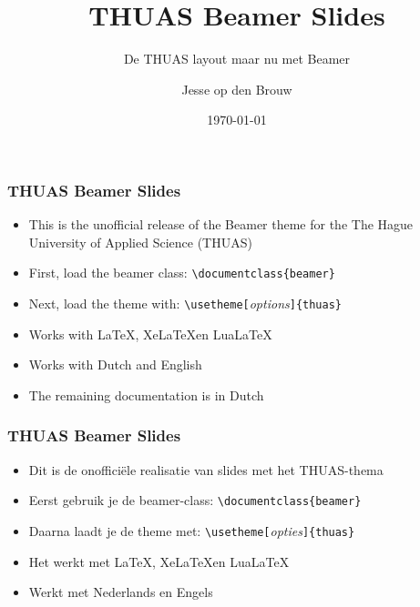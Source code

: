 \documentclass[fleqn,aspectratio=169,dutch,10pt]{beamer}
\title{THUAS Beamer Slides}
\subtitle{De THUAS layout maar nu met Beamer}
\author{Jesse op den Brouw}
\date{\today}
\begin{document}
\maketitle


\begin{frame}[fragile]
\frametitle{THUAS Beamer Slides}
\begin{itemize}
\item This is the unofficial release of the Beamer theme for the The Hague University of Applied Science (THUAS)
\item First, load the beamer class: \lstinline|\documentclass{beamer}|
\item Next, load the theme with: \lstinline|\usetheme[|\emph{\small options}\lstinline|]{thuas}|
\item Works with \LaTeX, Xe\LaTeX en Lua\LaTeX
\item Works with Dutch and English
\item The remaining documentation is in Dutch
\end{itemize}
\end{frame}


\begin{frame}[fragile]
\frametitle{THUAS Beamer Slides}
\begin{itemize}
\item Dit is de onofficiële realisatie van slides met het THUAS-thema
\item Eerst gebruik je de beamer-class: \lstinline|\documentclass{beamer}|
\item Daarna laadt je de theme met: \lstinline|\usetheme[|\emph{\small opties}\lstinline|]{thuas}|
\item Het werkt met \LaTeX, Xe\LaTeX en Lua\LaTeX
\item Werkt met Nederlands en Engels
\end{itemize}
\end{frame}
\end{document}
